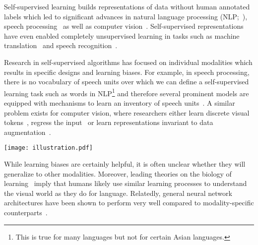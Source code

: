 \documentclass[nohyperref]{article}
\theoremstyle{plain}
\theoremstyle{definition}
\theoremstyle{remark}
\newcommand{\name}{data2vec}
\begin{document}
Self-supervised learning builds representations of data without human annotated labels which led to significant advances in natural language processing (NLP;~\citealt{peters2018acl,radford2018unsup,devlin2018bert,brown2020gpt3}), speech processing~\citep{oord2018cpc,schneider2019wav2vec,baevski2020wav} as well as computer vision~\citep{chen2020simple,chen2021mocov3,caron2021dino,bao2021beit,he2021mae}.
Self-supervised representations have even enabled completely unsupervised learning in tasks such as machine translation~\citep{lample2018unsupmt} and speech recognition~\citep{baevski2021unsupervised}.

Research in self-supervised algorithms has focused on individual modalities which results in specific designs and learning biases.
For example, in speech processing, there is no vocabulary of speech units over which we can define a self-supervised learning task such as words in NLP\footnote{This is true for many languages but not for certain Asian languages.} and therefore several prominent models are equipped with mechanisms to learn an inventory of speech units~\citep{baevski2020wav,hsu2020hubert}.
A similar problem exists for computer vision, where researchers either learn discrete visual tokens~\citep{radford2021clip,bao2021beit}, regress the input~\citep{he2021mae} or learn representations invariant to data augmentation~\citep{chen2020simple,grill2020byol,caron2021dino}.

\begin{figure*}[h!t]
\begin{center}
\texttt{[image: illustration.pdf]}
\caption{Illustration of how \name{} follows the same learning process for different modalities. 
The model first produces representations of the original input example (teacher mode) which are then regressed by the same model based on a masked version of the input. 
The teacher parameters are an exponentially moving average of the student weights. 
The student predicts the average of $K$ network layers of the teacher (shaded in blue). 
\label{fig:model}
}
\end{center}
\end{figure*}


While learning biases are certainly helpful, it is often unclear whether they will generalize to other modalities.
Moreover, leading theories on the biology of learning~\citep{friston2009predictive,friston2010free} imply that humans likely use similar learning processes to understand the visual world as they do for language.
Relatedly, general neural network architectures have been shown to perform very well compared to modality-specific counterparts~\citep{jaegle2021perceiver}.
\end{document}
